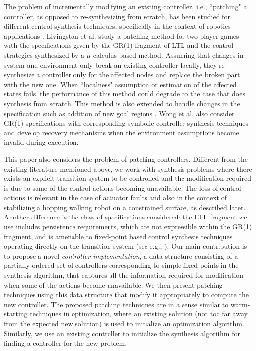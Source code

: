 The problem of incrementally modifying an existing controller, i.e., ``patching" a controller, as opposed to re-synthesizing from scratch, has been studied for different control synthesis techniques, specifically in the context of robotics applications \cite{Livingston,Livingston2014,wong2014correct}. Livingston et al. \cite{Livingston} study a patching method for two player games with the specifications given by the GR(1) fragment of LTL and the control strategies synthesized by a $ \mu $-calculus based method. Assuming that changes in system and environment only break an existing controller locally, they re-synthesize a controller only for the affected nodes and replace the broken part with the new one. When ``localness" assumption or estimation of the affected states fails, the performance of this method could degrade to the case that does synthesis from scratch. This method is also extended to handle changes in the specification such as addition of new goal regions \cite{Livingston2014}. Wong et al. \cite{wong2014correct} also consider GR(1) specifications with corresponding symbolic controller synthesis techniques and develop recovery mechanisms when the environment assumptions become invalid during execution. 

This paper also considers the problem of patching controllers. Different from the existing literature mentioned above, we work with synthesis problems where there exists an explicit transition system to be controlled and the modification required is due to some of the control actions becoming unavailable. The loss of control actions is relevant in the case of actuator faults and also in the context of stabilizing a hopping {\color{purple} walking} robot on a constrained surface, as described later. Another difference is the class of specifications considered: the LTL fragment we use includes persistence requirements, which are not expressible within the GR(1) fragment, and is amenable to fixed-point based control synthesis techniques operating directly on the transition system (see e.g., \cite{wolff2013efficient,Nilsson2017}). Our main contribution is to propose a novel \emph{controller implementation}, a data structure consisting of a partially ordered set of controllers corresponding to simple fixed-points in the synthesis algorithm,  that captures all the information required for modification when some of the actions become unavailable. We then present patching techniques using this data structure that modify it appropriately to compute the new controller. The proposed patching techniques are in a sense similar to warm-starting techniques in optimization, where an existing solution (not too far away from the expected new solution) is used to initialize an optimization algorithm. Similarly, we use an existing controller to initialize the synthesis algorithm for finding a controller for the new problem. 


